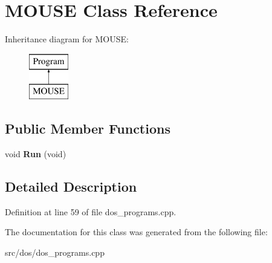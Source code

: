 \hypertarget{classMOUSE}{\section{M\-O\-U\-S\-E Class Reference}
\label{classMOUSE}
}
Inheritance diagram for M\-O\-U\-S\-E\-:\begin{figure}[H]
\begin{center}
\leavevmode
\includegraphics[height=2.000000cm]{classMOUSE}
\end{center}
\end{figure}
\subsection*{Public Member Functions}
\begin{DoxyCompactItemize}
\item 
\hypertarget{classMOUSE_a534674c1b95232e1fa0a0ec93bcbd698}{void {\bfseries Run} (void)}\label{classMOUSE_a534674c1b95232e1fa0a0ec93bcbd698}

\end{DoxyCompactItemize}


\subsection{Detailed Description}


Definition at line 59 of file dos\-\_\-programs.\-cpp.



The documentation for this class was generated from the following file\-:\begin{DoxyCompactItemize}
\item 
src/dos/dos\-\_\-programs.\-cpp\end{DoxyCompactItemize}
